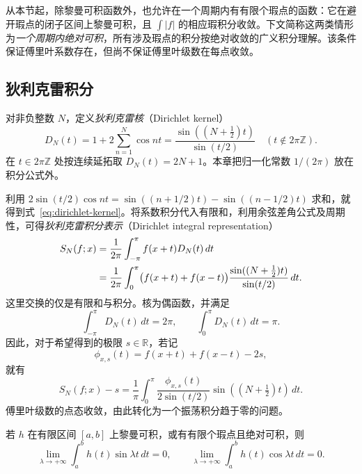 从本节起，除黎曼可积函数外，也允许在一个周期内有有限个瑕点的函数：它在避开瑕点的闭子区间上黎曼可积，且 $\int|f|$ 的相应瑕积分收敛。下文简称这两类情形为\emph{一个周期内绝对可积}，所有涉及瑕点的积分按绝对收敛的广义积分理解。该条件保证傅里叶系数存在，但尚不保证傅里叶级数在每点收敛。

\subsection{狄利克雷积分}
\label{subsec:dirichlet-integral}

\begin{definition}
\label{def:dirichlet-kernel}
对非负整数 $N$，定义\emph{狄利克雷核}（Dirichlet kernel）
\begin{equation}
    D_N(t)=1+2\sum_{n=1}^N\cos nt
       =\frac{\sin((N+\tfrac12)t)}{\sin(t/2)}
       \quad(t\notin2\pi\mathbb Z).
    \label{eq:dirichlet-kernel}
\end{equation}
在 $t\in2\pi\mathbb Z$ 处按连续延拓取 $D_N(t)=2N+1$。本章把归一化常数 $1/(2\pi)$ 放在积分公式外。
\end{definition}

利用 $2\sin(t/2)\cos nt=\sin((n+1/2)t)-\sin((n-1/2)t)$ 求和，就得到式~\eqref{eq:dirichlet-kernel}。将系数积分代入有限和，利用余弦差角公式及周期性，可得\emph{狄利克雷积分表示}（Dirichlet integral representation）
\begin{align}
    S_N(f;x)&=\frac1{2\pi}\int_{-\pi}^{\pi}f(x+t)D_N(t)\,dt\notag\\
       &=\frac1{2\pi}\int_0^\pi
         \bigl(f(x+t)+f(x-t)\bigr)
         \frac{\sin((N+\tfrac12)t)}{\sin(t/2)}\,dt.
    \label{eq:dirichlet-integral-representation}
\end{align}
这里交换的仅是有限和与积分。核为偶函数，并满足
\begin{equation}
    \int_{-\pi}^{\pi}D_N(t)\,dt=2\pi,
    \qquad \int_0^\pi D_N(t)\,dt=\pi.
    \label{eq:dirichlet-kernel-mass}
\end{equation}
因此，对于希望得到的极限 $s\in\mathbb R$，若记
\[
    \phi_{x,s}(t)=f(x+t)+f(x-t)-2s,
\]
就有
\begin{equation}
    S_N(f;x)-s=\frac1\pi\int_0^\pi
       \frac{\phi_{x,s}(t)}{2\sin(t/2)}
                    \sin((N+\tfrac12)t)\,dt.
    \label{eq:fourier-pointwise-error-integral}
\end{equation}
傅里叶级数的点态收敛，由此转化为一个振荡积分趋于零的问题。

\begin{lemma}[黎曼--勒贝格引理]
\label{lem:riemann-lebesgue-finite-integral}
若 $h$ 在有限区间 $[a,b]$ 上黎曼可积，或有有限个瑕点且绝对可积，则
\begin{equation}
    \lim_{\lambda\to+\infty}\int_a^bh(t)\sin\lambda t\,dt=0,
    \qquad
    \lim_{\lambda\to+\infty}\int_a^bh(t)\cos\lambda t\,dt=0.
    \label{eq:riemann-lebesgue-finite-integral}
\end{equation}
\end{lemma}

